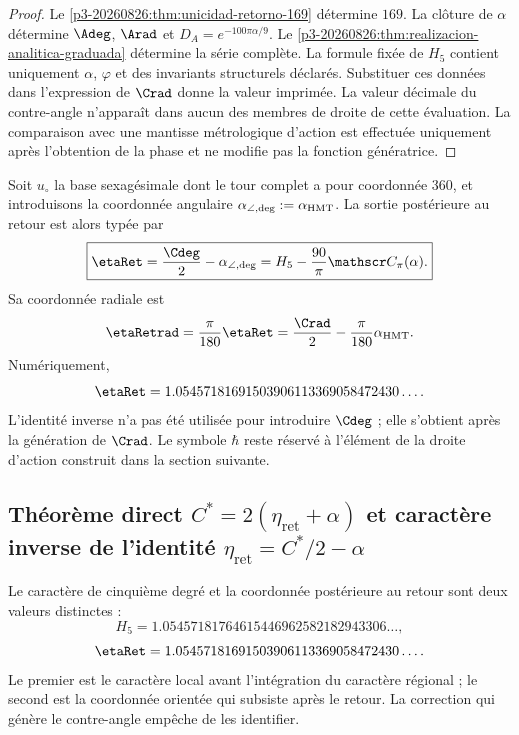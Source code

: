 \begin{proof}
Le \cref{p3-20260826:thm:unicidad-retorno-169} détermine \(169\). La clôture de
\(\alpha\) détermine \(\Adeg\), \(\Arad\) et
\(D_A=e^{-100\pi\alpha/9}\). Le \cref{p3-20260826:thm:realizacion-analitica-graduada}
détermine la série complète. La formule fixée de \(H_5\) contient uniquement
\(\alpha\), \(\varphi\) et des invariants structurels déclarés. Substituer
ces données dans l'expression de \(\Crad\) donne la valeur imprimée. La valeur décimale
du contre-angle n'apparaît dans aucun des membres de droite de cette
évaluation. La comparaison avec une mantisse métrologique d'action est effectuée
uniquement après l'obtention de la phase et ne modifie pas la fonction génératrice.
\end{proof}

Soit \(u_\circ\) la base sexagésimale dont le tour complet a pour coordonnée
\(360\), et introduisons la coordonnée angulaire
\(\alpha_{\angle,{\rm deg}}:=\alpha_{\rm HMT}\). La sortie postérieure au
retour est alors typée par
\[
\boxed{
\etaRet
=\frac{\Cdeg}2-\alpha_{\angle,{\rm deg}}
=H_5-\frac{90}{\pi}\mathscr C_\pi(\alpha).}
\]
Sa coordonnée radiale est
\[
 \etaRetrad=\frac{\pi}{180}\etaRet
 =\frac{\Crad}{2}-\frac{\pi}{180}\alpha_{\rm HMT}.
\]
Numériquement,
\[
\etaRet
=1.05457181691503906113369058472430\ldots.
\]
L'identité inverse n'a pas été utilisée pour introduire \(\Cdeg\) ; elle s'obtient
après la génération de \(\Crad\). Le symbole \(\hbar\) reste réservé à
l'élément de la droite d'action construit dans la section suivante.

\subsection{Théorème direct \texorpdfstring{\(C^*=2(\eta_{\mathrm{ret}}+\alpha)\)}{C*=2(eta_ret+alpha)} et caractère inverse de l'identité \texorpdfstring{\(\eta_{\mathrm{ret}}=C^*/2-\alpha\)}{eta_ret=C*/2-alpha}}
\label{sec:s102:c38:4:3}


Le caractère de cinquième degré et la coordonnée postérieure au retour
sont deux valeurs distinctes :
\[
H_5
=1.05457181764615446962582182943306\ldots,
\]
\[
\etaRet
=1.05457181691503906113369058472430\ldots.
\]
Le premier est le caractère local avant l'intégration du caractère régional ; le
second est la coordonnée orientée qui subsiste après le retour. La correction
qui génère le contre-angle empêche de les identifier.

